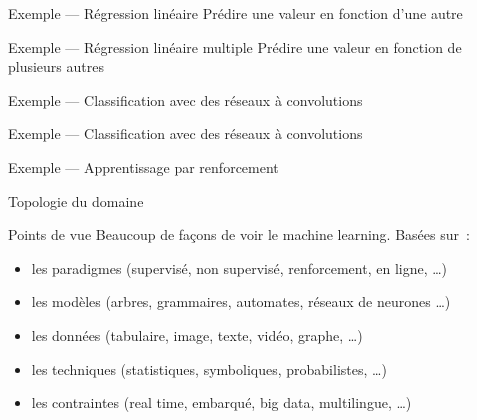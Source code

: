 \begin{frame}{Exemple --- Régression linéaire}
  Prédire une valeur en fonction d'une autre

\end{frame}

\begin{frame}{Exemple --- Régression linéaire multiple}
  Prédire une valeur en fonction de plusieurs autres

\end{frame}

\begin{frame}{Exemple --- Classification avec des réseaux à convolutions}
  
\end{frame}

\begin{frame}{Exemple --- Classification avec des réseaux à convolutions}
\end{frame}

\begin{frame}{Exemple --- Apprentissage par renforcement}
\end{frame}

\begin{frame}{Topologie du domaine}
\end{frame}

\begin{frame}{Points de vue}
  Beaucoup de façons de voir le machine learning. Basées sur :
  \begin{itemize}[<+->]
  \item les paradigmes (supervisé, non supervisé, renforcement, en
    ligne, …)
  \item les modèles (arbres, grammaires, automates, réseaux de
    neurones …)
  \item les données (tabulaire, image, texte, vidéo, graphe, …)
  \item les techniques (statistiques, symboliques, probabilistes, …)
  \item les contraintes (real time, embarqué, big data, multilingue,
    …)
  \end{itemize}

\end{frame}

